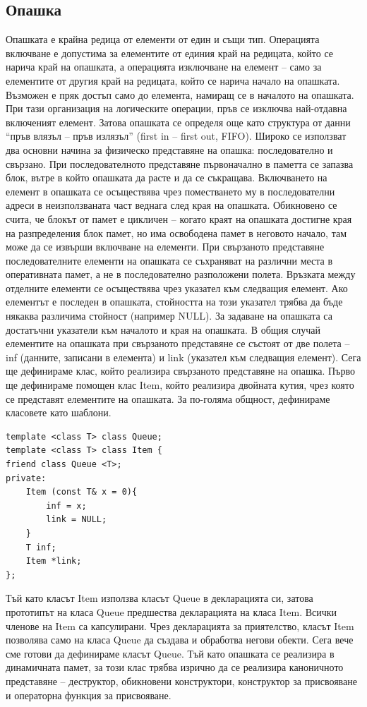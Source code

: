 \documentclass[11pt]{article} %
\begin{document}
\subsection{Опашка}
Опашката е крайна редица от елементи от един и същи тип. Операцията включване е допустима за елементите от единия край на редицата, който се нарича край на опашката, а операцията изключване на елемент – само за елементите от другия край на редицата, който се нарича начало на опашката. Възможен е пряк достъп само до елемента, намиращ се в началото на опашката. При тази организация на логическите операции, пръв се изключва най-отдавна включеният елемент. Затова опашката се определя още като структура от данни  “пръв влязъл – пръв излязъл” (first in – first out, FIFO).
Широко се използват два основни начина за физическо представяне на опашка: последователно и свързано.
При последователното представяне първоначално в паметта се запазва блок, вътре в който опашката да расте и да се съкращава. Включването на елемент в опашката се осъществява чрез поместването му в последователни адреси в неизползваната част веднага след края на опашката. Обикновено се счита, че блокът от памет е цикличен – когато краят на опашката достигне края на разпределения блок памет, но има освободена памет в неговото начало, там може да се извърши включване на елементи.
При свързаното представяне последователните елементи на опашката се съхраняват на различни места в оперативната памет, а не в последователно разположени полета. Връзката между отделните елементи се осъществява чрез указател към следващия елемент. Ако елементът е последен в опашката, стойността на този указател трябва да бъде някаква различима стойност (например NULL). За задаване на опашката са достатъчни указатели към началото и края на опашката. В общия случай елементите на опашката при свързаното представяне се състоят от две полета – inf (данните, записани в елемента) и link (указател към следващия елемент). Сега ще дефинираме клас, който реализира свързаното представяне на опашка.
Първо ще дефинираме помощен клас Item, който реализира двойната кутия, чрез която се представят елементите на опашката.
За по-голяма общност, дефинираме класовете като шаблони.

\begin{verbatim}
template <class T> class Queue;
template <class T> class Item {
friend class Queue <T>;
private:
	Item (const T& x = 0){ 
		inf = x;
		link = NULL;
	}
	T inf;
	Item *link;
};
\end{verbatim}
Тъй като класът Item използва класът Queue в декларацията си, затова прототипът на класа Queue предшества декларацията на класа Item. Всички членове на Item са капсулирани. Чрез декларацията за приятелство, класът Item позволява само на класа Queue да създава и обработва негови обекти. Сега вече сме готови да дефинираме класът Queue. Тъй като опашката се реализира в динамичната памет, за този клас трябва изрично да се реализира каноничното представяне – деструктор, обикновени конструктори, конструктор за присвояване и операторна функция за присвояване.
\end{document}
